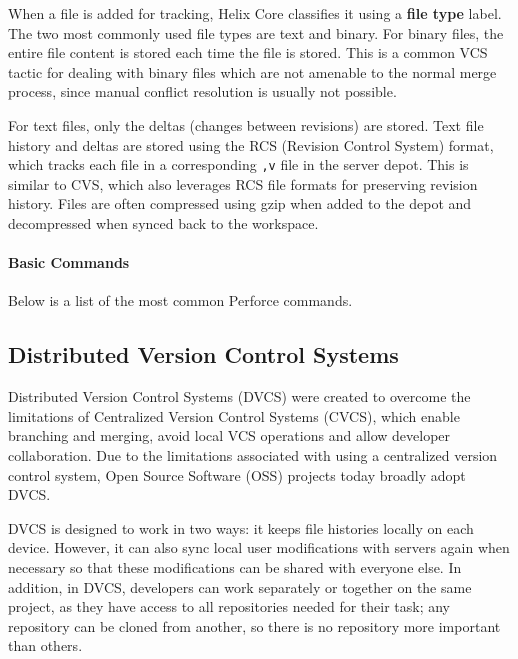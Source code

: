 When a file is added for tracking, Helix Core classifies it using a \textbf{file type} label. The two most commonly used file types are text and binary. For binary files, the entire file content is stored each time the file is stored. This is a common VCS tactic for dealing with binary files which are not amenable to the normal merge process, since manual conflict resolution is usually not possible.

For text files, only the deltas (changes between revisions) are stored. Text file history and deltas are stored using the RCS (Revision Control System) format, which tracks each file in a corresponding \lstinline{,v} file in the server depot. This is similar to CVS, which also leverages RCS file formats for preserving revision history. Files are often compressed using gzip when added to the depot and decompressed when synced back to the workspace.


\paragraph{Basic Commands}

Below is a list of the most common Perforce commands.

\subsection{Distributed Version Control Systems}
Distributed Version Control Systems (DVCS) were created to overcome the limitations of Centralized Version Control Systems (CVCS), which enable branching and merging, avoid local VCS operations and allow developer collaboration. Due to the limitations associated with using a centralized version control system, Open Source Software (OSS) projects today broadly adopt DVCS.

DVCS is designed to work in two ways: it keeps file histories locally on each device. However, it can also sync local user modifications with servers again when necessary so that these modifications can be shared with everyone else. In addition, in DVCS, developers can work separately or together on the same project, as they have access to all repositories needed for their task; any repository can be cloned from another, so there is no repository more important than others.

